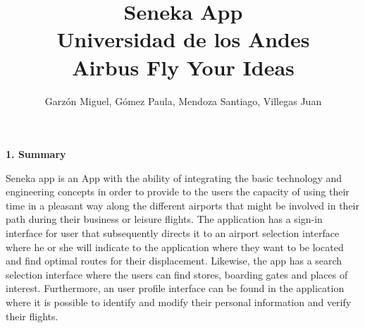 \documentclass[]{article}
\begin{document}
\title{Seneka App\\
Universidad de los Andes\\
Airbus Fly Your Ideas}
\author{Garzón Miguel, Gómez Paula, Mendoza Santiago, Villegas Juan}
\maketitle


\Large{
\textbf{1. Summary}\\
}

Seneka app is an App with the ability of integrating the basic technology and engineering concepts in order to provide to the users the capacity of using their time in a pleasant way along the different airports that might be involved in their path during their business or leisure flights. The application has a sign-in interface for user that subsequently directs it to an airport selection interface where he or she will indicate to the application where they want to be located and find optimal routes for their displacement. Likewise, the app has a search selection interface where the users can find stores, boarding gates and places of interest. Furthermore, an user profile interface can be found in the application where it is possible to identify and modify their personal information and verify their flights.\\

\end{document}
